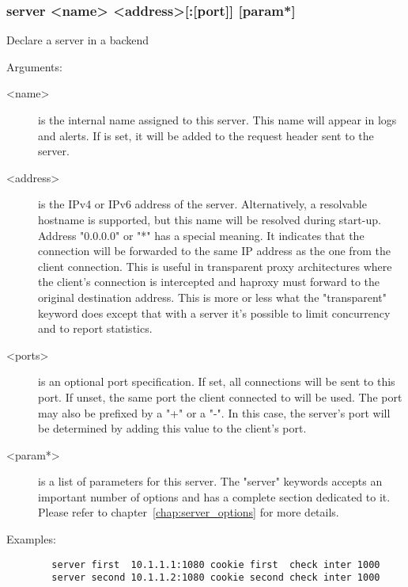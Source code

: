\subsubsection[server]{server <name> <address>[:[port]] [param*]}


  Declare a server in a backend


  Arguments:
  \begin{description}
  \item[<name>] is the internal name assigned to this server. This name will
              appear in logs and alerts.  If  is
              set, it will be added to the request header sent to the server.

  \item[<address>] is the IPv4 or IPv6 address of the server. Alternatively, a
              resolvable hostname is supported, but this name will be resolved
              during start-up. Address "0.0.0.0" or "*" has a special meaning.
              It indicates that the connection will be forwarded to the same IP
              address as the one from the client connection. This is useful in
              transparent proxy architectures where the client's connection is
              intercepted and haproxy must forward to the original destination
              address. This is more or less what the "transparent" keyword does
              except that with a server it's possible to limit concurrency and
              to report statistics.

   \item[<ports>] is an optional port specification. If set, all connections will
              be sent to this port. If unset, the same port the client
              connected to will be used. The port may also be prefixed by a "+"
              or a "-". In this case, the server's port will be determined by
              adding this value to the client's port.

  \item[<param*>] is a list of parameters for this server. The "server" keywords
              accepts an important number of options and has a complete section
              dedicated to it. Please refer to chapter~\ref{chap:server_options} for more details.
  \end{description}

  Examples:
  \begin{verbatim}
        server first  10.1.1.1:1080 cookie first  check inter 1000
        server second 10.1.1.2:1080 cookie second check inter 1000
  \end{verbatim}


